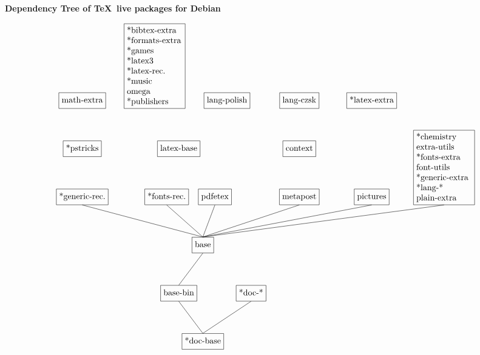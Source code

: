 \documentclass[a4paper,landscape]{article}
\begin{document}
\thispagestyle{empty}
\centerline{\bfseries Dependency Tree of \TeX\ live packages for Debian}

\bigskip
\[
\begin{tikzpicture}
  \node[above] (doc-base)	at (5,-2)	[draw]	{{*}doc-base\strut};
  \node[above] (base-bin)	at (4,0)	[draw]	{base-bin\strut};
  \node[above] (doc)		at (7,0)	[draw]	{{*}doc-{*}\strut};

  \node[above] (base)		at (5,2)	[draw]	{base\strut};
  
  \node[above] (generic-rec)	at (0,4)	[draw]	{{*}generic-rec.\strut};
  \node[above] (fonts-rec)	at (3.5,4)	[draw]	{{*}fonts-rec.\strut};
  \node[above] (pdfetex)	at (5.5,4)	[draw]	{pdfetex\strut};
  \node[above] (metapost)	at (9,4)	[draw]	{metapost\strut};
  \node[above] (pictures)	at (12,4)	[draw]	{pictures\strut};
  \node[above] (generic-extra)	at (15,4)	[draw]	{%
  	\parbox[t]{2.3cm}{%
		       {*}chemistry\\
		       extra-utils\\
		       {*}fonts-extra\\
		       font-utils\\
			{*}generic-extra\\
		       {*}lang-*\\
		       plain-extra}};

  \node[above] (pstricks)	at (0,6)	[draw]	{{*}pstricks\strut};
  \node[above] (latex-base)	at (4,6)	[draw]	{latex-base\strut};
  \node[above] (context)	at (9,6)	[draw]	{context\strut};

  \node[above] (math-extra)	at (0,8)	[draw]	{math-extra\strut};
  \node[above]	(bibtex-extra)	at (3,8)	[draw]	{%
  	\parbox[t]{2.3cm}{{*}bibtex-extra\\
		       	{*}formats-extra\\
			{*}games\\
			{*}latex3\\
			{*}latex-rec.\\
			{*}music\\
		        omega\\
			{*}publishers}};
  \node[above] (lang-polish)	at (6,8)	[draw]	{lang-polish\strut};
  \node[above] (lang-czsk)	at (9,8)	[draw]	{lang-czsk\strut};
  \node[above] (latex-extra)	at (12,8)	[draw]	{{*}latex-extra\strut};

  \draw (base.south) -- (base-bin.north);
  \draw (base-bin.south) -- (doc-base.north);
  \draw (doc.south) -- (doc-base.north);

  \draw (generic-rec.south) -- (base.north);
  \draw (fonts-rec.south) -- (base.north);
  \draw (pdfetex.south) -- (base.north);
  \draw (metapost.south) -- (base.north);
  \draw (pictures.south) -- (base.north);
  \draw (generic-extra.south) -- (base.north);


\end{tikzpicture}\]
\end{document}
